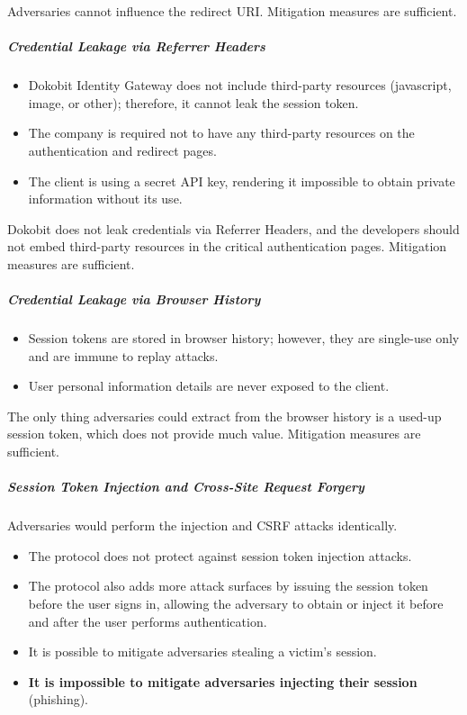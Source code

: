 Adversaries cannot influence the redirect URI. Mitigation measures are sufficient.

\subparagraph{Credential Leakage via Referrer Headers}

\begin{itemize}
  \item Dokobit Identity Gateway does not include third-party resources (javascript, image, or other); therefore, it cannot leak the session token.
  \item The company is required not to have any third-party resources on the authentication and redirect pages.
  \item The client is using a secret API key, rendering it impossible to obtain private information without its use.
\end{itemize}

Dokobit does not leak credentials via Referrer Headers, and the developers should not embed third-party resources in the critical authentication pages. Mitigation measures are sufficient.

\subparagraph{Credential Leakage via Browser History}

\begin{itemize}
  \item Session tokens are stored in browser history; however, they are single-use only and are immune to replay attacks.
  \item User personal information details are never exposed to the client.
\end{itemize}

The only thing adversaries could extract from the browser history is a used-up session token, which does not provide much value. Mitigation measures are sufficient.

\subparagraph{Session Token Injection and Cross-Site Request Forgery}

Adversaries would perform the injection and CSRF attacks identically.

\begin{itemize}
  \item The protocol does not protect against session token injection attacks.
  \item The protocol also adds more attack surfaces by issuing the session token before the user signs in, allowing the adversary to obtain or inject it before and after the user performs authentication.
  \item It is possible to mitigate adversaries stealing a victim's session.
  \item \textbf{It is impossible to mitigate adversaries injecting their session} (phishing).
\end{itemize}

